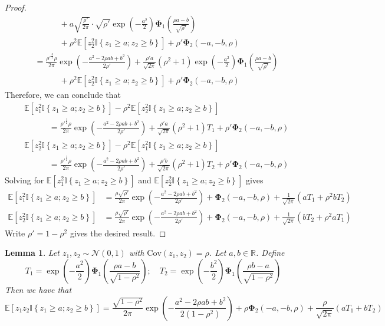 \documentclass[10pt]{article} %
\newtheorem{lemma}[theorem]{Lemma}
\theoremstyle{definition}
\theoremstyle{plain}
\newcommand{\paren}[1]{\left(#1\right)}
\newcommand{\indy}[1]{\mathbb{I}\left\{#1\right\}}
\providecommand{\E}{\mathbb{E}}
\providecommand{\R}{\mathbb{R}}
\begin{document}
\begin{proof}
\begin{align*}
        &\quad\quad\quad + a\sqrt{\frac{\rho'}{2\pi}}\cdot \sqrt{\rho'}\exp\paren{-\frac{a^2}{2}}\bm{\Phi}_1\paren{\frac{\rho a - b}{\sqrt{\rho'}}}\\
        & \quad\quad\quad + \rho^2\E\left[z_2^2\indy{z_1\geq a; z_2\geq b}\right] + \rho'\bm{\Phi}_2\paren{-a,-b,\rho}\\
        & = \frac{\rho'^{\frac{3}{2}}\rho}{2\pi}\exp\paren{-\frac{a^2 - 2\rho ab + b^2}{2\rho'}} + \frac{\rho'a}{\sqrt{2\pi}}\paren{\rho^2+1}\exp\paren{-\frac{a^2}{2}}\bm{\Phi}_1\paren{\frac{\rho a- b}{\sqrt{\rho'}}}\\
        &\quad\quad\quad + \rho^2\E\left[z_2^2\indy{z_1\geq a; z_2\geq b}\right] + \rho'\bm{\Phi}_2\paren{-a,-b,\rho}
    \end{align*}
    Therefore, we can conclude that
    \begin{align*}
        & \E\left[z_1^2\indy{z_1\geq a; z_2\geq b}\right] - \rho^2\E\left[z_2^2\indy{z_1\geq a; z_2\geq b}\right]\\
        &\quad\quad\quad  = \frac{\rho'^{\frac{3}{2}}\rho}{2\pi}\exp\paren{-\frac{a^2 - 2\rho ab + b^2}{2\rho'}} + \frac{\rho' a}{\sqrt{2\pi}}\paren{\rho^2+1}T_1 + \rho'\bm{\Phi}_2\paren{-a,-b,\rho}\\
        & \E\left[z_2^2\indy{z_1\geq a; z_2\geq b}\right] - \rho^2\E\left[z_1^2\indy{z_1\geq a; z_2\geq b}\right]\\
        &\quad\quad\quad  = \frac{\rho'^{\frac{3}{2}}\rho}{2\pi}\exp\paren{-\frac{a^2 - 2\rho ab + b^2}{2\rho'}} + \frac{\rho' b}{\sqrt{2\pi}}\paren{\rho^2+1}T_2 + \rho'\bm{\Phi}_2\paren{-a,-b,\rho}
    \end{align*}
    Solving for $\E\left[z_1^2\indy{z_1\geq a; z_2\geq b}\right]$ and $\E\left[z_2^2\indy{z_1\geq a; z_2\geq b}\right]$ gives
    \begin{align*}
        \E\left[z_1^2\indy{z_1\geq a; z_2\geq b}\right] & = \frac{\rho\sqrt{\rho'}}{2\pi}\exp\paren{-\frac{a^2 - 2\rho ab + b^2}{2\rho'}} + \bm{\Phi}_2\paren{-a,-b,\rho} + \frac{1}{\sqrt{2\pi}}\paren{aT_1 + \rho^2 bT_2}\\
        \E\left[z_2^2\indy{z_1\geq a; z_2\geq b}\right] & = \frac{\rho\sqrt{\rho'}}{2\pi}\exp\paren{-\frac{a^2 - 2\rho ab + b^2}{2\rho'}} + \bm{\Phi}_2\paren{-a,-b,\rho} + \frac{1}{\sqrt{2\pi}}\paren{bT_2 + \rho^2 aT_1}
    \end{align*}
    Write $\rho' = 1-\rho^2$ gives the desired result.
\end{proof}
\begin{lemma}
    \label{lem:prod_term_exp}
    Let $z_1, z_2\sim\mathcal{N}\paren{0, 1}$ with $\text{Cov}\paren{z_1, z_2} = \rho$. Let $a, b \in\R$. Define
    \[
        T_1 = \exp\paren{-\frac{a^2}{2}}\bm{\Phi}_1\paren{\frac{\rho a - b}{\sqrt{1-\rho^2}}};\quad T_2 = \exp\paren{-\frac{b^2}{2}}\bm{\Phi}_1\paren{\frac{\rho b - a}{\sqrt{1-\rho^2}}}
    \]
    Then we have that
    \[
        \E\left[z_1z_2\indy{z_1\geq a;z_2\geq b}\right] =  \frac{\sqrt{1-\rho^2}}{2\pi}\exp\paren{-\frac{a^2 - 2\rho ab + b^2}{2\paren{1-\rho^2}}} + \rho\bm{\Phi}_2\paren{-a,-b,\rho} + \frac{\rho}{\sqrt{2\pi}}\paren{aT_1 + bT_2}
    \]
\end{lemma}
\end{document}
